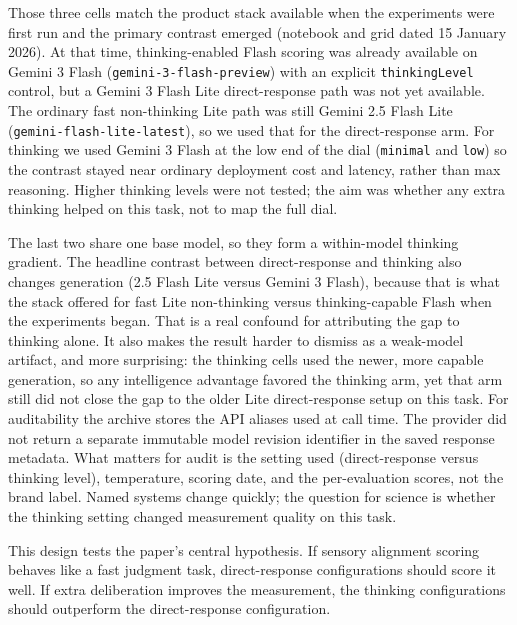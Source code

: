 \documentclass[11pt]{article}
\begin{document}
Those three cells match the product stack available when the experiments were
first run and the primary contrast emerged (notebook and grid dated 15 January
2026). At that time, thinking-enabled Flash scoring was already available on
Gemini 3 Flash (\texttt{gemini-3-flash-preview}) with an explicit
\texttt{thinkingLevel} control, but a Gemini 3 Flash Lite direct-response
path was not yet available. The ordinary fast non-thinking Lite path was
still Gemini 2.5 Flash Lite (\texttt{gemini-flash-lite-latest}), so we used
that for the direct-response arm. For thinking we used Gemini 3 Flash at the
low end of the dial (\texttt{minimal} and \texttt{low}) so the contrast
stayed near ordinary deployment cost and latency, rather than max reasoning.
Higher thinking levels were not tested; the aim was whether any extra
thinking helped on this task, not to map the full dial.

The last two share one base model, so they form a within-model thinking
gradient. The headline contrast between direct-response and thinking also
changes generation (2.5 Flash Lite versus Gemini 3 Flash), because that is
what the stack offered for fast Lite non-thinking versus thinking-capable
Flash when the experiments began. That is a real confound for attributing the
gap to thinking alone. It also makes the result harder to dismiss as a
weak-model artifact, and more surprising: the thinking cells used the newer,
more capable generation, so any intelligence advantage favored the thinking
arm, yet that arm still did not close the gap to the older Lite
direct-response setup on this task. For auditability the archive stores the
API aliases used at call time.
The provider did not return a separate immutable model revision identifier in
the saved response metadata. What matters for audit is the setting used
(direct-response versus thinking level), temperature, scoring date, and the
per-evaluation scores, not the brand label. Named systems change quickly; the
question for science is whether the thinking setting changed measurement
quality on this task.

This design tests the paper's central hypothesis. If sensory alignment scoring
behaves like a fast judgment task, direct-response configurations should score
it well. If extra deliberation improves the measurement, the thinking
configurations should outperform the direct-response configuration.
\end{document}
